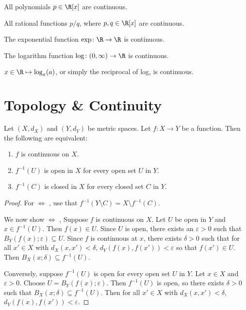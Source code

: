 \begin{examples}
    \item All polynomials $p \in \R[x]$ are continuous.
    \item All rational functions $p/q$,
    where $p, q \in \R[x]$ are continuous.
    \item The exponential function $\exp\colon \R \to \R$ is continuous.
    \item The logarithm function $\log\colon (0, \infty) \to \R$
    is continuous.
    \item $x \in \R \mapsto \log_x(a)$, or simply the reciprocal of
    log, is continuous.
\end{examples}
\section{Topology \& Continuity} \label{sec:cont:topology}
\begin{theorem} \label{thm:cont:topology}
    Let $(X, d_X)$ and $(Y, d_Y)$ be metric spaces.
    Let $f\colon X \to Y$ be a function.
    Then the following are equivalent:
    \begin{enumerate}
        \item $f$ is continuous on $X$.
        \label{thm:cont:topology:cont}
        \item $f^{-1}(U)$ is open in $X$ for every open set $U$ in $Y$.
        \label{thm:cont:topology:open}
        \item $f^{-1}(C)$ is closed in $X$ for every closed set $C$ in $Y$.
        \label{thm:cont:topology:closed}
    \end{enumerate}
\end{theorem}
\begin{proof}
    For 
    $\iff$ ,
    use that $f^{-1}(Y \setminus C) = X \setminus f^{-1}(C)$.

    We now show 
    $\iff$ ,
    Suppose $f$ is continuous on $X$.
    Let $U$ be open in $Y$ and $x \in f^{-1}(U)$.
    Then $f(x) \in U$.
    Since $U$ is open, there exists an $\varepsilon > 0$ such that
    $B_Y(f(x); \varepsilon) \subseteq U$.
    Since $f$ is continuous at $x$, there exists $\delta > 0$ such that
    for all $x' \in X$ with $d_X(x, x') < \delta$,
    $d_Y(f(x), f(x')) < \varepsilon$ so that $f(x') \in U$.
    Then $B_X(x; \delta) \subseteq f^{-1}(U)$.

    Conversely, suppose $f^{-1}(U)$ is open for every open set $U$ in $Y$.
    Let $x \in X$ and $\varepsilon > 0$.
    Choose $U = B_Y(f(x); \varepsilon)$.
    Then $f^{-1}(U)$ is open, so there exists $\delta > 0$ such that
    $B_X(x; \delta) \subseteq f^{-1}(U)$.
    Then for all $x' \in X$ with $d_X(x, x') < \delta$,
    $d_Y(f(x), f(x')) < \varepsilon$.
\end{proof}
